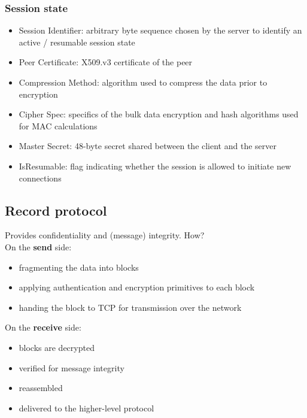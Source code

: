 \documentclass[a4paper, 10pt, titlepage]{article}
\begin{document}
\subsubsection{Session state}
\begin{itemize}
\item Session Identifier: arbitrary byte sequence chosen by the server to identify an active / resumable session state
\item Peer Certificate: X509.v3 certificate of the peer
\item Compression Method: algorithm used to compress the data prior to encryption
\item Cipher Spec: specifics of the bulk data encryption and hash algorithms used for MAC calculations
\item Master Secret: 48-byte secret shared between the client and the server
\item IsResumable: flag indicating whether the session is allowed to initiate new connections
\end{itemize}

\subsection{Record protocol}
Provides confidentiality and (message) integrity. How?\\
On the \textbf{send} side:
\begin{itemize}
\item fragmenting the data into blocks
\item applying authentication and encryption primitives to each block
\item handing the block to TCP for transmission over the network
\end{itemize}
On the \textbf{receive} side:
\begin{itemize}
\item blocks are decrypted
\item verified for message integrity
\item reassembled
\item delivered to the higher-level protocol
\end{itemize}
\end{document}
